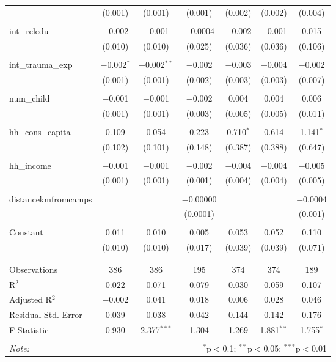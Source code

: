 \begin{table}[H]
\begin{tabular}{@{\extracolsep{4pt}}lcccccc}
  & (0.001) & (0.001) & (0.001) & (0.002) & (0.002) & (0.004) \\ 
  & & & & & & \\ 
 int\_reledu & $-$0.002 & $-$0.001 & $-$0.0004 & $-$0.002 & $-$0.001 & 0.015 \\ 
  & (0.010) & (0.010) & (0.025) & (0.036) & (0.036) & (0.106) \\ 
  & & & & & & \\ 
 int\_trauma\_exp & $-$0.002$^{*}$ & $-$0.002$^{**}$ & $-$0.002 & $-$0.003 & $-$0.004 & $-$0.002 \\ 
  & (0.001) & (0.001) & (0.002) & (0.003) & (0.003) & (0.007) \\ 
  & & & & & & \\ 
 num\_child & $-$0.001 & $-$0.001 & $-$0.002 & 0.004 & 0.004 & 0.006 \\ 
  & (0.001) & (0.001) & (0.003) & (0.005) & (0.005) & (0.011) \\ 
  & & & & & & \\ 
 hh\_cons\_capita & 0.109 & 0.054 & 0.223 & 0.710$^{*}$ & 0.614 & 1.141$^{*}$ \\ 
  & (0.102) & (0.101) & (0.148) & (0.387) & (0.388) & (0.647) \\ 
  & & & & & & \\ 
 hh\_income & $-$0.001 & $-$0.001 & $-$0.002 & $-$0.004 & $-$0.004 & $-$0.005 \\ 
  & (0.001) & (0.001) & (0.001) & (0.004) & (0.004) & (0.005) \\ 
  & & & & & & \\ 
 distancekmfromcamps &  &  & $-$0.00000 &  &  & $-$0.0004 \\ 
  &  &  & (0.0001) &  &  & (0.001) \\ 
  & & & & & & \\ 
 Constant & 0.011 & 0.010 & 0.005 & 0.053 & 0.052 & 0.110 \\ 
  & (0.010) & (0.010) & (0.017) & (0.039) & (0.039) & (0.071) \\ 
  & & & & & & \\ 
\hline \\[-1.8ex] 
Observations & 386 & 386 & 195 & 374 & 374 & 189 \\ 
R$^{2}$ & 0.022 & 0.071 & 0.079 & 0.030 & 0.059 & 0.107 \\ 
Adjusted R$^{2}$ & $-$0.002 & 0.041 & 0.018 & 0.006 & 0.028 & 0.046 \\ 
Residual Std. Error & 0.039 & 0.038 & 0.042 & 0.144 & 0.142 & 0.176 \\ 
F Statistic & 0.930 & 2.377$^{***}$ & 1.304 & 1.269 & 1.881$^{**}$ & 1.755$^{*}$ \\ 
\hline 
\hline \\[-1.8ex] 
\textit{Note:}  & \multicolumn{6}{r}{$^{*}$p$<$0.1; $^{**}$p$<$0.05; $^{***}$p$<$0.01} \\ 
\end{tabular} 
\end{table} 

